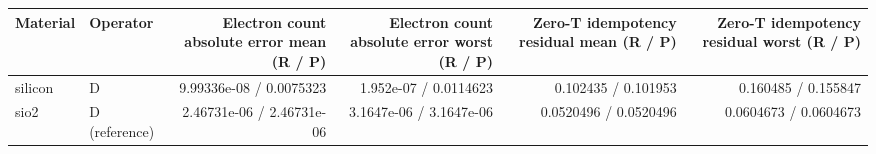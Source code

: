 \begin{tabular}{llrrrr}
\toprule
Material & Operator & Electron count absolute error mean (R / P) & Electron count absolute error worst (R / P) & Zero-T idempotency residual mean (R / P) & Zero-T idempotency residual worst (R / P) \\
\midrule
silicon & D & 9.99336e-08 / 0.0075323 & 1.952e-07 / 0.0114623 & 0.102435 / 0.101953 & 0.160485 / 0.155847 \\
sio2 & D (reference) & 2.46731e-06 / 2.46731e-06 & 3.1647e-06 / 3.1647e-06 & 0.0520496 / 0.0520496 & 0.0604673 / 0.0604673 \\
\bottomrule
\end{tabular}

